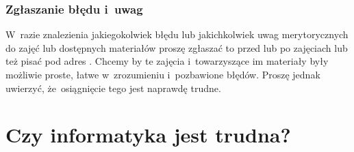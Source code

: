 \documentclass[10pt,t]{beamer}
\begin{document}
\begin{frame}










\end{frame}









\begin{frame}
  \frametitle{Zgłaszanie błędu i~uwag}


  W~razie znalezienia jakiegokolwiek błędu lub jakichkolwiek uwag
  merytorycznych do zajęć lub dostępnych materiałów proszę zgłaszać to
  przed lub po zajęciach lub też pisać pod adres \email. Chcemy by te
  zajęcia i~towarzyszące im materiały były możliwie proste, łatwe
  w~zrozumieniu i~pozbawione błędów. Proszę jednak uwierzyć, że~osiągnięcie
  tego jest naprawdę trudne.

\end{frame}










\section{Czy informatyka jest trudna?}
\end{document}
